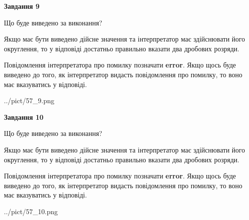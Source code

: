 \documentclass[12pt, ukrainian]{article}
\begin{document}
{\begin {Large}
{\begin {center}\textbf{Завдання 9}\end {center}}\par
Що буде виведено за виконання? \par

Якщо має бути виведено дійсне значення та інтерпретатор має здійснювати його округлення, 
то у відповіді достатньо правильно вказати два дробових розряди.

Повідомлення інтерпретатора про помилку позначати \textbf{error}.
Якщо щось буде виведено до того, як інтерпретатор видасть повідомлення про помилку, 
то воно має вказуватись у відповіді. \par

\begin{center}
	{../pict/57_9.png}
\end{center}
\newpage

{\begin {center}\textbf{Завдання 10}\end {center}}\par
Що буде виведено за виконання? \par

Якщо має бути виведено дійсне значення та інтерпретатор має здійснювати його округлення, 
то у відповіді достатньо правильно вказати два дробових розряди.

Повідомлення інтерпретатора про помилку позначати \textbf{error}.
Якщо щось буде виведено до того, як інтерпретатор видасть повідомлення про помилку, 
то воно має вказуватись у відповіді. \par

\begin{center}
	{../pict/57_10.png}
\end{center}
\newpage

\end {Large}}
\end{document}
